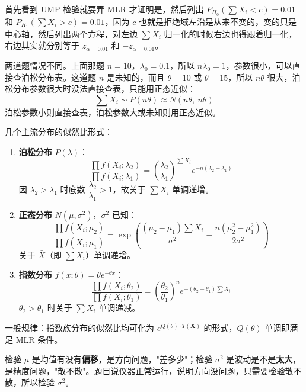 \begin{dxtips}
    首先看到 UMP 检验就要弄 MLR 才证明是，然后列出 $P_{H_0}(\sum X_i < c) = 0.01$ 和 $P_{H_1}(\sum X_i > c) = 0.01$，因为 $c$ 也就是拒绝域左沿是从来不变的，变的只是中心轴，然后列出两个方程，对左边 $\sum X_i$ 归一化的时候右边也得跟着归一化，右边其实就分别等于 $z_{\alpha=0.01}$ 和 $-z_{\alpha=0.01}$。
\end{dxtips}
\begin{note}
    两道题情况不同。上面那题 $n=10$，$\lambda_0=0.1$，所以 $n\lambda_0 = 1$，参数很小，可以直接查泊松分布表。这道题 $n$ 是未知的，而且 $\theta=10$ 或 $\theta=15$，所以 $n\theta$ 很大，泊松分布参数很大时没法直接查表，只能用正态近似：
$$\sum X_i \sim P(n\theta) \approx N(n\theta,\ n\theta)$$
泊松参数小则直接查表，泊松参数大或未知则用正态近似。
\end{note}
\begin{note}
几个主流分布的似然比形式：

\begin{enumerate}
    \item \textbf{泊松分布} $P(\lambda)$：
    \[
    \frac{\prod f(X_i;\lambda_2)}{\prod f(X_i;\lambda_1)} = \left(\frac{\lambda_2}{\lambda_1}\right)^{\sum X_i} e^{-n(\lambda_2-\lambda_1)}
    \]
    因 $\lambda_2 > \lambda_1$ 时底数 $\dfrac{\lambda_2}{\lambda_1} > 1$，故关于 $\sum X_i$ 单调递增。

    \item \textbf{正态分布} $N(\mu, \sigma^2)$，$\sigma^2$ 已知：
    \[
    \frac{\prod f(X_i;\mu_2)}{\prod f(X_i;\mu_1)} = \exp\!\left(\frac{(\mu_2-\mu_1)\sum X_i}{\sigma^2} - \frac{n(\mu_2^2-\mu_1^2)}{2\sigma^2}\right)
    \]
    关于 $\bar{X}$（即 $\sum X_i$）单调递增。

    \item \textbf{指数分布} $f(x;\theta) = \theta e^{-\theta x}$：
    \[
    \frac{\prod f(X_i;\theta_2)}{\prod f(X_i;\theta_1)} = \left(\frac{\theta_2}{\theta_1}\right)^n e^{-(\theta_2-\theta_1)\sum X_i}
    \]
    $\theta_2 > \theta_1$ 时关于 $\sum X_i$ 单调递减。
\end{enumerate}

一般规律：指数族分布的似然比均可化为 $e^{Q(\theta)\cdot T(\boldsymbol{X})}$ 的形式，$Q(\theta)$ 单调即满足 MLR 条件。
\end{note}
\begin{dxtips}
    检验 $\mu$ 是均值有没有\textbf{偏移}，是方向问题，"差多少"；检验 $\sigma^2$ 是波动是不是\textbf{太大}，是精度问题，"散不散"。题目说仪器正常运行，说明方向没问题，只需要检验散不散，所以检验 $\sigma^2$。
\end{dxtips}
